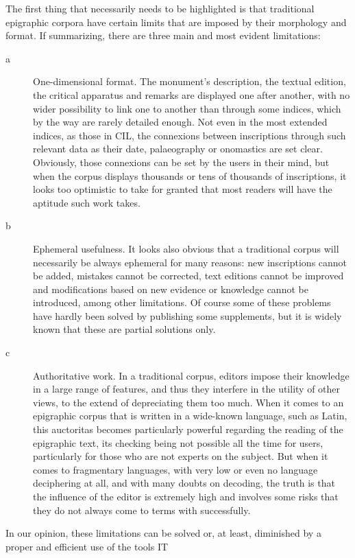 \documentclass[amsthm,ebook]{saparticle}
\begin{document}
The first thing that necessarily needs to be highlighted is that traditional epigraphic corpora have certain limits that
are imposed by their morphology and format. If summarizing, there are three main and most evident limitations: 
\begin{description}
\item[a] One-dimensional format. The monument's description, the textual edition, the critical apparatus and remarks are
displayed one after another, with no wider possibility to link one to another than through some indices, which by the
way are rarely detailed enough. Not even in the most extended indices, as those in CIL, the connexions between
inscriptions through such relevant data as their date, palaeography or onomastics are set clear. Obviously, those
connexions can be set by the users in their mind, but when the corpus displays thousands or tens of thousands of
inscriptions, it looks too optimistic to take for granted that most readers will have the aptitude such work takes.

\item[b] Ephemeral usefulness. It looks also obvious that a traditional corpus will necessarily be always ephemeral for many
reasons: new inscriptions cannot be added, mistakes cannot be corrected, text editions cannot be improved and
modifications based on new evidence or knowledge cannot be introduced, among other limitations. Of course some of these
problems have hardly been solved by publishing some supplements, but it is widely known that these are partial
solutions only.

\item[c] Authoritative work. In a traditional corpus, editors impose their knowledge in a large range of features, and thus
they interfere in the utility of other views, to the extend of depreciating them too much. When it comes to an
epigraphic corpus that is written in a wide-known language, such as Latin, this auctoritas becomes particularly
powerful regarding the reading of the epigraphic text, its checking being not possible all the time for users,
particularly for those who are not experts on the subject. But when it comes to fragmentary languages, with very low or
even no language deciphering at all, and with many doubts on decoding, the truth is that the influence of the editor is
extremely high and involves some risks that they do not always come to terms with successfully.


\end{description}
In our opinion, these limitations can be solved or, at least, diminished by a proper and efficient use of the tools IT
\end{document}
